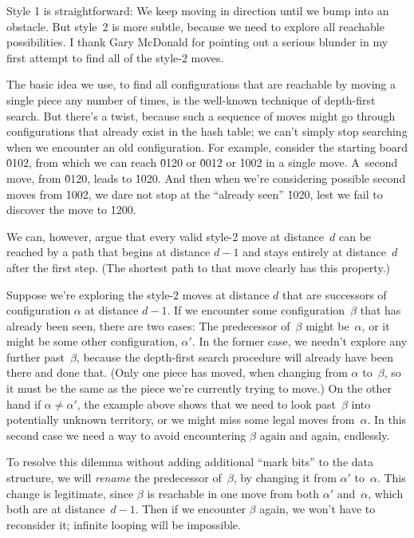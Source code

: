 Style 1 is straightforward: We keep moving in direction 
until we
bump into an obstacle. But style~2 is more subtle, because we need to explore
all reachable possibilities. I thank Gary McDonald for pointing out a
serious blunder in my first attempt to find all of the style-2 moves.

The basic idea we use, to find all configurations that are reachable by
moving a single piece any number of times, is the well-known technique
of depth-first search. But there's a twist, because such a sequence of
moves might go through configurations that already exist in the hash table;
we can't simply stop searching when we encounter an old configuration.
For example, consider the starting board \.{0102}, from which we can
reach \.{0120} or \.{0012} or \.{1002} in a single move. A~second move,
from \.{0120}, leads to \.{1020}. And then when we're considering
possible second moves from \.{1002}, we dare not stop at the
``already seen'' \.{1020}, lest we fail to discover the move to \.{1200}.

We can, however, argue that every valid style-2 move at distance~$d$ can be
reached by a path that begins at distance $d-1$ and stays entirely at
distance~$d$ after the first step. (The shortest path to that move
clearly has this property.)

Suppose we're exploring the style-2 moves at distance $d$ that are successors
of configuration $\alpha$ at distance $d-1$. If we encounter some
configuration~$\beta$ that has already been seen, there are two cases:
The predecessor of~$\beta$ might be~$\alpha$, or it might be some other
configuration, $\alpha'$. In the former case, we needn't explore any
further past~$\beta$, because the depth-first search procedure will already
have been there and done that. (Only one piece has moved, when changing
from $\alpha$ to~$\beta$, so it must be the same as the piece we're currently
trying to move.) On the other hand if $\alpha\ne\alpha'$, the example above
shows that we need to look past~$\beta$ into potentially unknown territory, or
we might miss some legal moves from~$\alpha$. In this second case we
need a way to avoid encountering $\beta$ again and again, endlessly.

To resolve this dilemma without adding additional ``mark bits'' to the data
structure, we will {\it rename\/} the predecessor of~$\beta$, by changing it
from $\alpha'$ to~$\alpha$. This change is legitimate, since $\beta$ is
reachable in one move from both $\alpha'$ and~$\alpha$, which both are at
distance~$d-1$. Then if we encounter $\beta$ again, we won't have to
reconsider it; infinite looping will be impossible.

